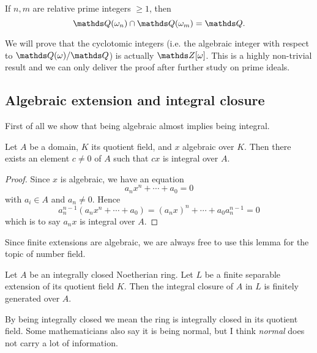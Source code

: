 				\begin{corollary}
					If $n,m$ are relative prime integers $\ge 1$, then
					\[
						\Q(\omega_n) \cap \Q(\omega_m) = \Q.
					\]
				\end{corollary}
			
				We will prove that the cyclotomic integers (i.e. the algebraic integer with respect to $\Q(\omega)/\Q$) is actually $\Z[\omega]$. This is a highly non-trivial result and we can only deliver the proof after further study on prime ideals.
		\subsection{Algebraic extension and integral closure}
			First of all we show that being algebraic almost implies being integral. 
			\begin{lemma}\label{alg-int}
				Let $A$ be a domain, $K$ its quotient field, and $x$ algebraic over $K$. Then there exists an element $c \ne 0$ of $A$ such that $cx$ is integral over $A$.
			\end{lemma}
			\begin{proof}
				Since $x$ is algebraic, we have an equation
				\[
					a_nx^n+\cdots+a_0=0
				\]
				with $a_i \in A$ and $a_n \ne 0$. Hence
				\[
					a_n^{n-1}(a_nx^n+\cdots+a_0)=(a_nx)^n+\cdots+a_0a_n^{n-1}=0
				\]
				which is to say $a_nx$ is integral over $A$. 
			\end{proof}
			
			Since finite extensions are algebraic, we are always free to use this lemma for the topic of number field.
			
			\begin{theorem}\label{closure-f-g}
				Let $A$ be an integrally closed Noetherian ring. Let $L$ be a finite separable extension of its quotient field $K$. Then the integral closure of $A$ in $L$ is finitely generated over $A$.
			\end{theorem}
		
			By being integrally closed we mean the ring is integrally closed in its quotient field. Some mathematicians also say it is being normal, but I think \textit{normal} does not carry a lot of information.
			
